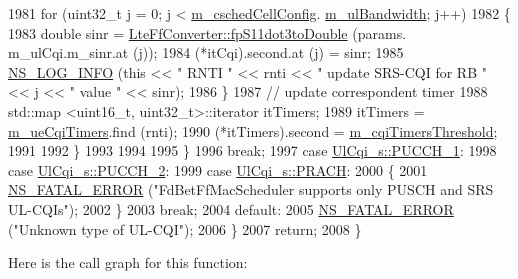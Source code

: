 \begin{DoxyCode}
1981             \textcolor{keywordflow}{for} (uint32\_t j = 0; j < \hyperlink{classns3_1_1FdBetFfMacScheduler_a52a10018d36c6a2e69820346a327dfc9}{m\_cschedCellConfig}.
      \hyperlink{structns3_1_1FfMacCschedSapProvider_1_1CschedCellConfigReqParameters_a5ab5b102878e6e7e7727a14af4a64d2f}{m\_ulBandwidth}; j++)
1982               \{
1983                 \textcolor{keywordtype}{double} sinr = \hyperlink{classns3_1_1LteFfConverter_aa5d8c2a8f988dbd63da91818c18666eb}{LteFfConverter::fpS11dot3toDouble} (params.
      m\_ulCqi.m\_sinr.at (j));
1984                 (*itCqi).second.at (j) = sinr;
1985                 \hyperlink{group__logging_gafbd73ee2cf9f26b319f49086d8e860fb}{NS\_LOG\_INFO} (\textcolor{keyword}{this} << \textcolor{stringliteral}{" RNTI "} << rnti << \textcolor{stringliteral}{" update SRS-CQI for RB  "} << j << \textcolor{stringliteral}{"
       value "} << sinr);
1986               \}
1987             \textcolor{comment}{// update correspondent timer}
1988             std::map <uint16\_t, uint32\_t>::iterator itTimers;
1989             itTimers = \hyperlink{classns3_1_1FdBetFfMacScheduler_ae6bef84c07e9ff1f50541f7f286114c6}{m\_ueCqiTimers}.find (rnti);
1990             (*itTimers).second = \hyperlink{classns3_1_1FdBetFfMacScheduler_ad25e8d5207cfa78201a9af0d38aab817}{m\_cqiTimersThreshold};
1991 
1992           \}
1993 
1994 
1995       \}
1996       \textcolor{keywordflow}{break};
1997     \textcolor{keywordflow}{case} \hyperlink{structns3_1_1UlCqi__s_aece9e5ebea42eb9ff1744c72c8459b57a05ca6554bc6fcd96a0a51fbaa8e794c7}{UlCqi\_s::PUCCH\_1}:
1998     \textcolor{keywordflow}{case} \hyperlink{structns3_1_1UlCqi__s_aece9e5ebea42eb9ff1744c72c8459b57a35664b4bda6f1cd6acfe9edc84c7571d}{UlCqi\_s::PUCCH\_2}:
1999     \textcolor{keywordflow}{case} \hyperlink{structns3_1_1UlCqi__s_aece9e5ebea42eb9ff1744c72c8459b57af93f36792cb1eed08f6119e4abfe58e8}{UlCqi\_s::PRACH}:
2000       \{
2001         \hyperlink{group__fatal_ga5131d5e3f75d7d4cbfd706ac456fdc85}{NS\_FATAL\_ERROR} (\textcolor{stringliteral}{"FdBetFfMacScheduler supports only PUSCH and SRS UL-CQIs"});
2002       \}
2003       \textcolor{keywordflow}{break};
2004     \textcolor{keywordflow}{default}:
2005       \hyperlink{group__fatal_ga5131d5e3f75d7d4cbfd706ac456fdc85}{NS\_FATAL\_ERROR} (\textcolor{stringliteral}{"Unknown type of UL-CQI"});
2006     \}
2007   \textcolor{keywordflow}{return};
2008 \}
\end{DoxyCode}


Here is the call graph for this function\+:




